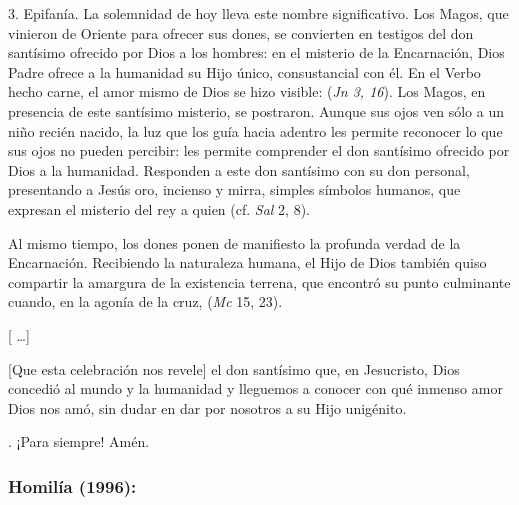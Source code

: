 \begin{body}
					3. Epifanía. La solemnidad de hoy lleva este nombre significativo. Los Magos, que vinieron de Oriente para ofrecer sus dones, se convierten en testigos del don santísimo ofrecido por Dios a los hombres: en el misterio de la Encarnación, Dios Padre ofrece a la humanidad su Hijo único, consustancial con él. En el Verbo hecho carne, el amor mismo de Dios se hizo visible:  (\emph{Jn 3, 16}). Los Magos, en presencia de este santísimo misterio, se postraron. Aunque sus ojos ven sólo a un niño recién nacido, la luz que los guía hacia adentro les permite reconocer lo que sus ojos no pueden percibir: les permite comprender el don santísimo ofrecido por Dios a la humanidad. Responden a este don santísimo con su don personal, presentando a Jesús oro, incienso y mirra, simples símbolos humanos, que expresan el misterio del rey a quien  (cf. \emph{Sal} 2, 8).
					
					Al mismo tiempo, los dones ponen de manifiesto la profunda verdad de la Encarnación. Recibiendo la naturaleza humana, el Hijo de Dios también quiso compartir la amargura de la existencia terrena, que encontró su punto culminante cuando, en la agonía de la cruz,  (\emph{Mc} 15, 23).
					
					{[} \ldots{}{]}
					
					{[}Que esta celebración nos revele{]} el don santísimo que, en Jesucristo, Dios concedió al mundo y la humanidad y lleguemos a conocer con qué inmenso amor Dios nos amó, sin dudar en dar por nosotros a su Hijo unigénito.
					
					. ¡Para siempre! Amén.
				\end{body}
			
			\subsubsection{Homilía (1996):} 
			
				
